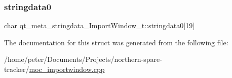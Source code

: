 \subsubsection{\texorpdfstring{stringdata0}{stringdata0}}
{\footnotesize\ttfamily char qt\+\_\+meta\+\_\+stringdata\+\_\+\+Import\+Window\+\_\+t\+::stringdata0\mbox{[}19\mbox{]}}



The documentation for this struct was generated from the following file\+:\begin{DoxyCompactItemize}
\item 
/home/peter/\+Documents/\+Projects/northern-\/spare-\/tracker/\hyperlink{moc__importwindow_8cpp}{moc\+\_\+importwindow.\+cpp}\end{DoxyCompactItemize}
